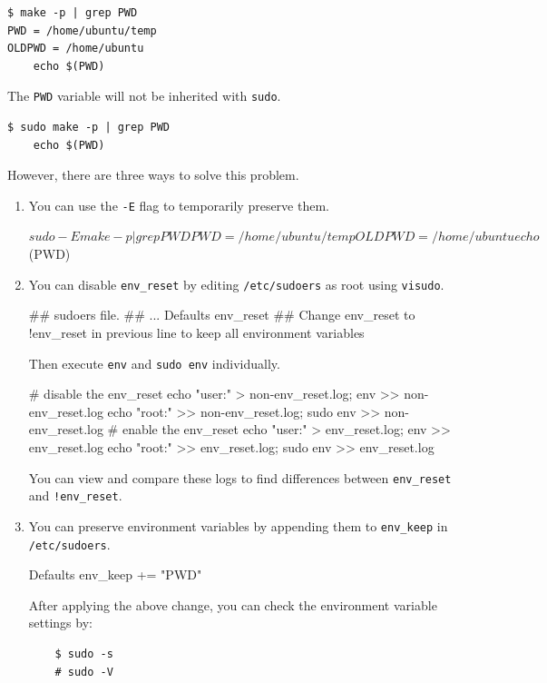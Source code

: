 \documentclass[10pt, oneside]{book}
\begin{document}
\begin{verbatim}
$ make -p | grep PWD
PWD = /home/ubuntu/temp
OLDPWD = /home/ubuntu
	echo $(PWD)
\end{verbatim}

The \verb|PWD| variable will not be inherited with \verb|sudo|.

\begin{verbatim}
$ sudo make -p | grep PWD
	echo $(PWD)
\end{verbatim}

However, there are three ways to solve this problem.

\begin{enumerate}
  \item {
  You can use the \verb|-E| flag to temporarily preserve them.

  \begin{codebash}
    $ sudo -E make -p | grep PWD
    PWD = /home/ubuntu/temp
    OLDPWD = /home/ubuntu
    echo $(PWD)
  \end{codebash}
  }

  \item {
  You can disable \verb|env_reset| by editing \verb|/etc/sudoers| as root using \verb|visudo|.

  \begin{code}
  ## sudoers file.
  ##
  ...
  Defaults env_reset
  ## Change env_reset to !env_reset in previous line to keep all environment variables
  \end{code}

  Then execute \verb|env| and \verb|sudo env| individually.

  \begin{codebash}
    # disable the env_reset
    echo "user:" > non-env_reset.log; env >> non-env_reset.log
    echo "root:" >> non-env_reset.log; sudo env >> non-env_reset.log
    # enable the env_reset
    echo "user:" > env_reset.log; env >> env_reset.log
    echo "root:" >> env_reset.log; sudo env >> env_reset.log
  \end{codebash}

  You can view and compare these logs to find differences between \verb|env_reset| and \verb|!env_reset|.
  }

  \item {You can preserve environment variables by appending them to \verb|env_keep| in \verb|/etc/sudoers|.

  \begin{code}
  Defaults env_keep += "PWD"
  \end{code}

  After applying the above change, you can check the environment variable settings by:

  \begin{verbatim}
    $ sudo -s
    # sudo -V
  \end{verbatim}
  }
\end{enumerate}
\end{document}
